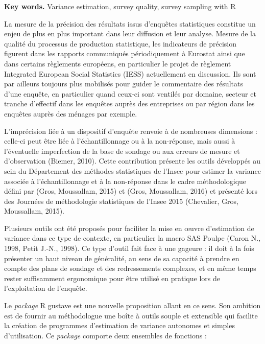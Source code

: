 \documentclass[12pt]{article}
\begin{document}
{\bf Key words.} Variance estimation, survey quality, survey sampling with R


\bigskip\bigskip


La mesure de la précision des résultats issus d'enquêtes statistiques constitue un enjeu de plus en plus important dans leur diffusion et leur analyse. Mesure de la qualité du processus de production statistique, les indicateurs de précision figurent dans les rapports communiqués périodiquement à Eurostat ainsi que dans certains règlements européens, en particulier le projet de règlement Integrated European Social Statistics (IESS) actuellement en discussion. Ils sont par ailleurs toujours plus mobilisés pour guider le commentaire des résultats d'une enquête, en particulier quand ceux-ci sont ventilés par domaine, secteur et tranche d'effectif dans les enquêtes auprès des entreprises ou par région dans les enquêtes auprès des ménages par exemple.

L'imprécision liée à un dispositif d'enquête renvoie à de nombreuses dimensions : celle-ci peut être liée à l'échantillonnage ou à la non-réponse, mais aussi à l'éventuelle imperfection de la base de sondage ou aux erreurs de mesure et d'observation (Biemer, 2010). Cette contribution présente les outils développés au sein du Département des méthodes statistiques de l'Insee pour estimer la variance associée à l'échantillonnage et à la non-réponse dans le cadre méthodologique défini par (Gros, Moussallam, 2015) et (Gros, Moussallam, 2016) et présenté lors des Journées de méthodologie statistiques de l'Insee 2015 (Chevalier, Gros, Moussallam, 2015). 

\bigskip Plusieurs outils ont été proposés pour faciliter la mise en \oe uvre d'estimation de variance dans ce type de contexte, en particulier la macro SAS Poulpe (Caron N., 1998, Petit J.-N., 1998). Ce type d'outil fait face à une gageure : il doit à la fois présenter un haut niveau de généralité, au sens de sa capacité à prendre en compte des plans de sondage et des redressements complexes, et en même temps rester suffisamment ergonomique pour être utilisé en pratique lors de l'exploitation de l'enquête.

Le \textit{package} R gustave est une nouvelle proposition allant en ce sens. Son ambition est de fournir au méthodologue une \og boîte à outils \fg{} souple et extensible qui facilite la création de programmes d'estimation de variance autonomes et simples d'utilisation. Ce \textit{package} comporte deux ensembles de fonctions :
\end{document}
